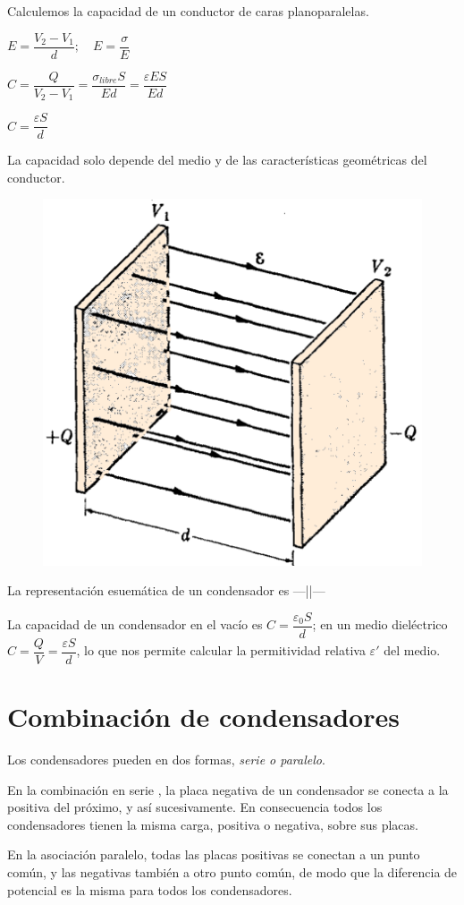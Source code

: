 \vspace{30mm} %
\begin{multicols}{2}
	Calculemos la capacidad de un conductor de caras planoparalelas.

$E=\dfrac{V_2-V_1}{d}; \quad E=\dfrac \sigma E$

$C=\dfrac {Q}{V_2-V_1}=\dfrac{\sigma_{libre}S}{Ed}=\dfrac{\varepsilon E S}{E d}$

$C=\dfrac{\varepsilon S}{d}$

La capacidad solo depende del medio y de las características geométricas del conductor.
\begin{figure}[H]
	\centering
	\includegraphics[width=.4\textwidth]{imagenes/imagenes24/T24IM12.png}
\end{figure}
\end{multicols}

La representación esuemática de un condensador es ---||---

La capacidad de un condensador en el vacío es $C=\dfrac {\varepsilon_0 S}{d}$; en un medio dieléctrico $C=\dfrac Q V=\dfrac{\varepsilon S}{d}$, lo que nos permite calcular la permitividad relativa $\varepsilon'$ del medio.

\section{Combinación de condensadores}

Los condensadores pueden en dos formas, \emph{serie o paralelo}.

En la combinación en serie , la placa negativa de un condensador se conecta a la positiva del próximo, y así sucesivamente. En consecuencia todos los condensadores tienen la misma carga, positiva o negativa, sobre sus placas.

En la asociación paralelo, todas las placas positivas se conectan a un punto común, y las negativas también a otro punto común, de modo que la diferencia de potencial es la misma para todos los condensadores.

